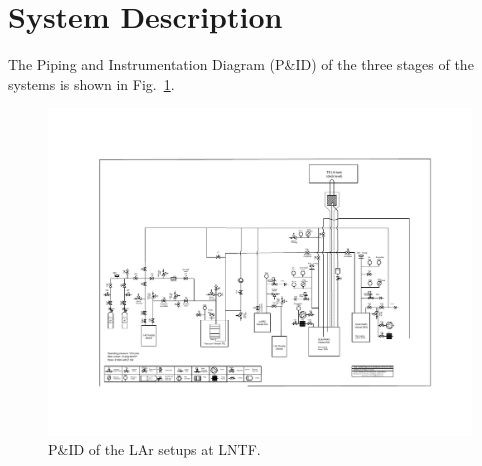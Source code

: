 \section{System Description}
\label{sec:system}

The Piping and Instrumentation Diagram (P\&ID) of the three stages
of the systems is shown in Fig.~\ref{fig:PID}.

\begin{figure}[h]
    \centering
    \includegraphics[width=\textwidth]{fig/PID_SLArchettoPAAS_v9.4.pdf}
    \caption{P\&ID of the LAr setups at LNTF.}
    \label{fig:PID}
\end{figure}

